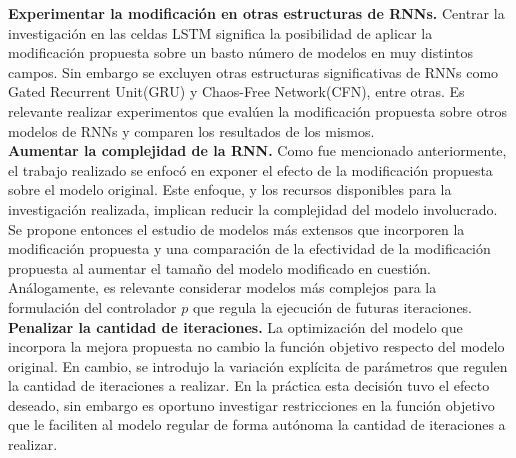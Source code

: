 \documentclass{article}
\begin{document}
	\textbf{Experimentar la modificación en otras estructuras de RNNs.} Centrar la investigación en las celdas LSTM significa la posibilidad de aplicar la modificación propuesta sobre un basto número de modelos en muy distintos campos. Sin embargo se excluyen otras estructuras significativas de RNNs como Gated Recurrent Unit(GRU) y Chaos-Free Network(CFN), entre otras. Es relevante realizar experimentos que evalúen la modificación propuesta sobre otros modelos de RNNs y comparen los resultados de los mismos.\\
	
	\textbf{Aumentar la complejidad de la RNN.} Como fue mencionado anteriormente, el trabajo realizado se enfocó en exponer el efecto de la modificación propuesta sobre el modelo original. Este enfoque, y los recursos disponibles para la investigación realizada, implican reducir la complejidad del modelo involucrado.\\
	Se propone entonces el estudio de modelos más extensos que incorporen la modificación propuesta y una comparación de la efectividad de la modificación propuesta al aumentar el tamaño del modelo modificado en cuestión. \\
	Análogamente, es relevante considerar modelos más complejos para la formulación del controlador $p$ que regula la ejecución de futuras iteraciones.\\
	
	\textbf{Penalizar la cantidad de iteraciones.} La optimización del modelo que incorpora la mejora propuesta no cambio la función objetivo respecto del modelo original. En cambio, se introdujo la variación explícita de parámetros que regulen la cantidad de iteraciones a realizar. En la práctica esta decisión tuvo el efecto deseado, sin embargo es oportuno investigar restricciones en la función objetivo que le faciliten al modelo regular de forma autónoma la cantidad de iteraciones a realizar.
	
\end{document}
